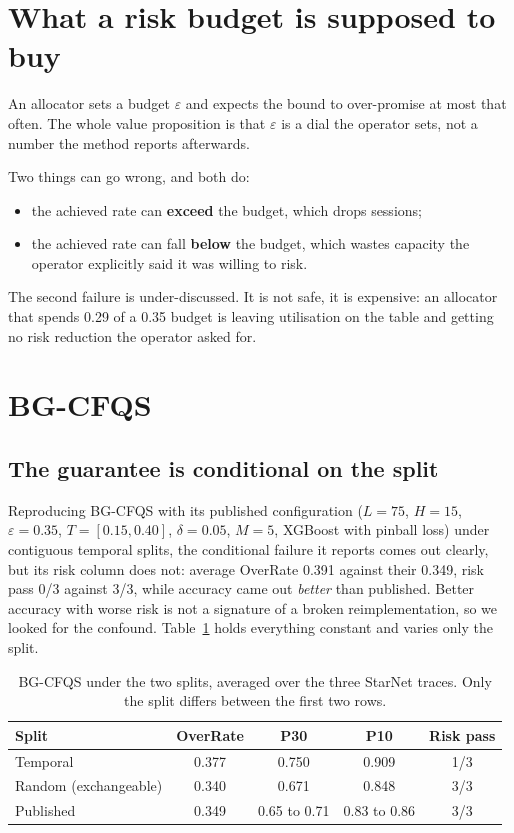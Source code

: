 \documentclass[acmsmall,screen]{acmart}
\begin{document}
\section{What a risk budget is supposed to buy}
\label{sec:budget}

An allocator sets a budget $\varepsilon$ and expects the bound to over-promise at most that often. The whole value proposition is that $\varepsilon$ is a dial the operator sets, not a number the method reports afterwards.

Two things can go wrong, and both do:
\begin{itemize}
\item the achieved rate can \textbf{exceed} the budget, which drops sessions;
\item the achieved rate can fall \textbf{below} the budget, which wastes capacity the operator explicitly said it was willing to risk.
\end{itemize}

The second failure is under-discussed. It is not safe, it is expensive: an allocator that spends 0.29 of a 0.35 budget is leaving utilisation on the table and getting no risk reduction the operator asked for.

\section{BG-CFQS}

\subsection{The guarantee is conditional on the split}
\label{sec:split}

Reproducing BG-CFQS with its published configuration ($L=75$, $H=15$, $\varepsilon=0.35$, $T=[0.15, 0.40]$, $\delta=0.05$, $M=5$, XGBoost with pinball loss) under contiguous temporal splits, the conditional failure it reports comes out clearly, but its risk column does not: average OverRate 0.391 against their 0.349, risk pass 0/3 against 3/3, while accuracy came out \emph{better} than published. Better accuracy with worse risk is not a signature of a broken reimplementation, so we looked for the confound. Table~\ref{tab:split} holds everything constant and varies only the split.

\begin{table}[t]
\caption{BG-CFQS under the two splits, averaged over the three StarNet traces. Only the split differs between the first two rows.}
\label{tab:split}
\begin{tabular}{lcccc}
\toprule
Split & OverRate & P30 & P10 & Risk pass \\
\midrule
Temporal & 0.377 & 0.750 & 0.909 & 1/3 \\
Random (exchangeable) & 0.340 & 0.671 & 0.848 & 3/3 \\
Published~\cite{xie2026bgcfqs} & 0.349 & 0.65 to 0.71 & 0.83 to 0.86 & 3/3 \\
\bottomrule
\end{tabular}
\end{table}
\end{document}
